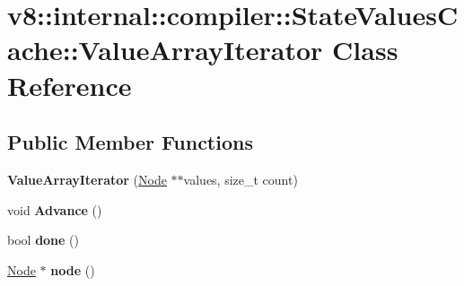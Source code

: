 \hypertarget{classv8_1_1internal_1_1compiler_1_1_state_values_cache_1_1_value_array_iterator}{}\section{v8\+:\+:internal\+:\+:compiler\+:\+:State\+Values\+Cache\+:\+:Value\+Array\+Iterator Class Reference}
\label{classv8_1_1internal_1_1compiler_1_1_state_values_cache_1_1_value_array_iterator}
\subsection*{Public Member Functions}
\begin{DoxyCompactItemize}
\item 
{\bfseries Value\+Array\+Iterator} (\hyperlink{classv8_1_1internal_1_1compiler_1_1_node}{Node} $\ast$$\ast$values, size\+\_\+t count)\hypertarget{classv8_1_1internal_1_1compiler_1_1_state_values_cache_1_1_value_array_iterator_adfae5b7ddea1f28d8f2584e685c6ed1a}{}\label{classv8_1_1internal_1_1compiler_1_1_state_values_cache_1_1_value_array_iterator_adfae5b7ddea1f28d8f2584e685c6ed1a}

\item 
void {\bfseries Advance} ()\hypertarget{classv8_1_1internal_1_1compiler_1_1_state_values_cache_1_1_value_array_iterator_a2f9b19c31d6c6bc5374c3b6fefb48ea3}{}\label{classv8_1_1internal_1_1compiler_1_1_state_values_cache_1_1_value_array_iterator_a2f9b19c31d6c6bc5374c3b6fefb48ea3}

\item 
bool {\bfseries done} ()\hypertarget{classv8_1_1internal_1_1compiler_1_1_state_values_cache_1_1_value_array_iterator_abcadbc553365b02a6e6d69dc54fad69f}{}\label{classv8_1_1internal_1_1compiler_1_1_state_values_cache_1_1_value_array_iterator_abcadbc553365b02a6e6d69dc54fad69f}

\item 
\hyperlink{classv8_1_1internal_1_1compiler_1_1_node}{Node} $\ast$ {\bfseries node} ()\hypertarget{classv8_1_1internal_1_1compiler_1_1_state_values_cache_1_1_value_array_iterator_ab3ebb73ff9fbefb28f5a8d9c100b950e}{}\label{classv8_1_1internal_1_1compiler_1_1_state_values_cache_1_1_value_array_iterator_ab3ebb73ff9fbefb28f5a8d9c100b950e}

\end{DoxyCompactItemize}
